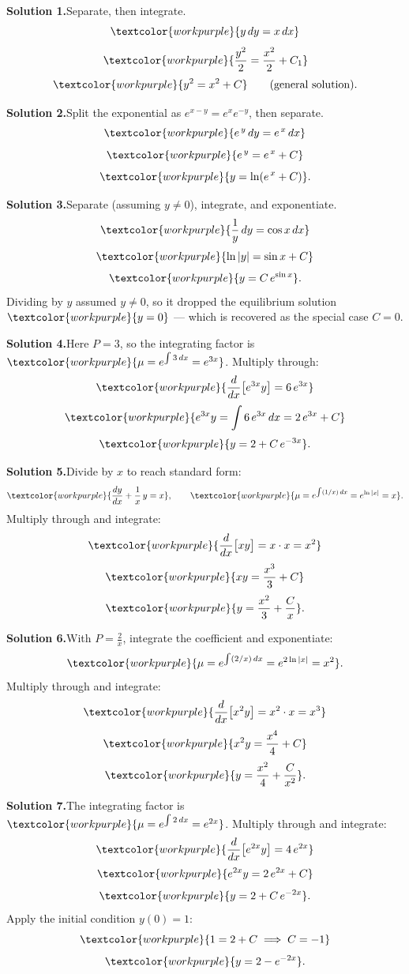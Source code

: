 \noindent\textbf{Solution 1.}\quad Separate, then integrate.
\[ \textcolor{workpurple}{y\,dy = x\,dx} \]
\[ \textcolor{workpurple}{\frac{y^{2}}{2} = \frac{x^{2}}{2} + C_{1}} \]
\[ \textcolor{workpurple}{y^{2} = x^{2} + C} \qquad\text{(general solution).} \]

\medskip
\noindent\textbf{Solution 2.}\quad Split the exponential as
$e^{x-y} = e^{x}e^{-y}$, then separate.
\[ \textcolor{workpurple}{e^{\,y}\,dy = e^{\,x}\,dx} \]
\[ \textcolor{workpurple}{e^{\,y} = e^{\,x} + C} \]
\[ \textcolor{workpurple}{y = \ln\!\left(e^{\,x} + C\right)}. \]

\medskip
\noindent\textbf{Solution 3.}\quad Separate (assuming $y \neq 0$), integrate,
and exponentiate.
\[ \textcolor{workpurple}{\frac{1}{y}\,dy = \cos x\,dx} \]
\[ \textcolor{workpurple}{\ln|y| = \sin x + C} \]
\[ \textcolor{workpurple}{y = C\,e^{\sin x}}. \]
Dividing by $y$ assumed $y \neq 0$, so it dropped the equilibrium solution
$\textcolor{workpurple}{y = 0}$ --- which is recovered as the special case $C = 0$.

\medskip
\noindent\textbf{Solution 4.}\quad Here $P = 3$, so the integrating factor is
$\textcolor{workpurple}{\mu = e^{\int 3\,dx} = e^{3x}}$. Multiply through:
\[ \textcolor{workpurple}{\frac{d}{dx}\big[e^{3x}y\big] = 6\,e^{3x}} \]
\[ \textcolor{workpurple}{e^{3x}y = \int 6\,e^{3x}\,dx = 2\,e^{3x} + C} \]
\[ \textcolor{workpurple}{y = 2 + C\,e^{-3x}}. \]

\medskip
\noindent\textbf{Solution 5.}\quad Divide by $x$ to reach standard form:
\[ \textcolor{workpurple}{\frac{dy}{dx} + \frac{1}{x}\,y = x}, \qquad
   \textcolor{workpurple}{\mu = e^{\int (1/x)\,dx} = e^{\ln|x|} = x}. \]
Multiply through and integrate:
\[ \textcolor{workpurple}{\frac{d}{dx}\big[xy\big] = x\cdot x = x^{2}} \]
\[ \textcolor{workpurple}{xy = \frac{x^{3}}{3} + C} \]
\[ \textcolor{workpurple}{y = \frac{x^{2}}{3} + \frac{C}{x}}. \]

\medskip
\noindent\textbf{Solution 6.}\quad With $P = \frac{2}{x}$, integrate the
coefficient and exponentiate:
\[ \textcolor{workpurple}{\mu = e^{\int (2/x)\,dx} = e^{2\ln|x|} = x^{2}}. \]
Multiply through and integrate:
\[ \textcolor{workpurple}{\frac{d}{dx}\big[x^{2}y\big] = x^{2}\cdot x = x^{3}} \]
\[ \textcolor{workpurple}{x^{2}y = \frac{x^{4}}{4} + C} \]
\[ \textcolor{workpurple}{y = \frac{x^{2}}{4} + \frac{C}{x^{2}}}. \]

\medskip
\noindent\textbf{Solution 7.}\quad The integrating factor is
$\textcolor{workpurple}{\mu = e^{\int 2\,dx} = e^{2x}}$. Multiply through and
integrate:
\[ \textcolor{workpurple}{\frac{d}{dx}\big[e^{2x}y\big] = 4\,e^{2x}} \]
\[ \textcolor{workpurple}{e^{2x}y = 2\,e^{2x} + C} \]
\[ \textcolor{workpurple}{y = 2 + C\,e^{-2x}}. \]
Apply the initial condition $y(0) = 1$:
\[ \textcolor{workpurple}{1 = 2 + C \;\Longrightarrow\; C = -1} \]
\[ \textcolor{workpurple}{y = 2 - e^{-2x}}. \]

